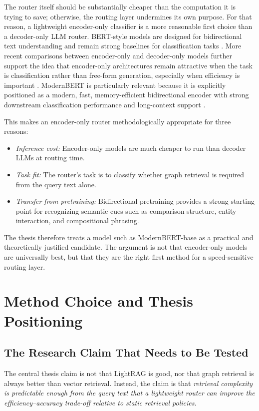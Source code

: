 \documentclass[11pt, a4paper]{article}
\begin{document}
The router itself should be substantially cheaper than the computation it is trying to save; otherwise, the routing layer undermines its own purpose. For that reason, a lightweight encoder-only classifier is a more reasonable first choice than a decoder-only LLM router. BERT-style models are designed for bidirectional text understanding and remain strong baselines for classification tasks \cite{devlin2019bert}. More recent comparisons between encoder-only and decoder-only models further support the idea that encoder-only architectures remain attractive when the task is classification rather than free-form generation, especially when efficiency is important \cite{benayas2024encoder}. ModernBERT is particularly relevant because it is explicitly positioned as a modern, fast, memory-efficient bidirectional encoder with strong downstream classification performance and long-context support \cite{warner2024modernbert}.

This makes an encoder-only router methodologically appropriate for three reasons:
\begin{itemize}[label=--]
    \item \emph{Inference cost:} Encoder-only models are much cheaper to run than decoder LLMs at routing time.
    \item \emph{Task fit:} The router's task is to classify whether graph retrieval is required from the query text alone.
    \item \emph{Transfer from pretraining:} Bidirectional pretraining provides a strong starting point for recognizing semantic cues such as comparison structure, entity interaction, and compositional phrasing.
\end{itemize}

The thesis therefore treats a model such as ModernBERT-base as a practical and theoretically justified candidate. The argument is not that encoder-only models are universally best, but that they are the right first method for a speed-sensitive routing layer.

\section{Method Choice and Thesis Positioning}

\subsection{The Research Claim That Needs to Be Tested}

The central thesis claim is not that LightRAG is good, nor that graph retrieval is always better than vector retrieval. Instead, the claim is that \emph{retrieval complexity is predictable enough from the query text that a lightweight router can improve the efficiency--accuracy trade-off relative to static retrieval policies}.
\end{document}
